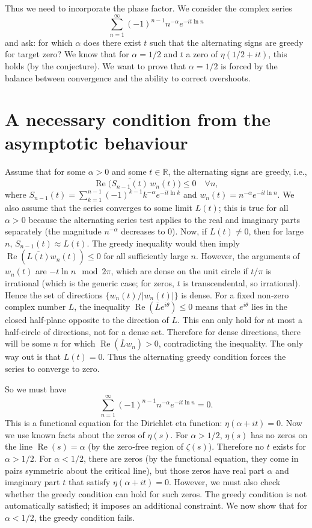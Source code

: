 \documentclass[12pt,a4paper]{article}
\begin{document}
Thus we need to incorporate the phase factor. We consider the complex series
\[
\sum_{n=1}^\infty (-1)^{n-1} n^{-\alpha} e^{-i t \ln n}
\]
and ask: for which $\alpha$ does there exist $t$ such that the alternating signs are greedy for target zero? We know that for $\alpha=1/2$ and $t$ a zero of $\eta(1/2+it)$, this holds (by the conjecture). We want to prove that $\alpha=1/2$ is forced by the balance between convergence and the ability to correct overshoots.

\section{A necessary condition from the asymptotic behaviour}

Assume that for some $\alpha>0$ and some $t\in\mathbb{R}$, the alternating signs are greedy, i.e.,
\[
\operatorname{Re}\bigl(\overline{S_{n-1}(t)} \, w_n(t)\bigr) \le 0 \quad \forall n,
\]
where $S_{n-1}(t) = \sum_{k=1}^{n-1} (-1)^{k-1} k^{-\alpha} e^{-i t \ln k}$ and $w_n(t)=n^{-\alpha}e^{-i t \ln n}$. We also assume that the series converges to some limit $L(t)$; this is true for all $\alpha>0$ because the alternating series test applies to the real and imaginary parts separately (the magnitude $n^{-\alpha}$ decreases to 0). Now, if $L(t) \neq 0$, then for large $n$, $S_{n-1}(t) \approx L(t)$. The greedy inequality would then imply $\operatorname{Re}(\overline{L(t)} w_n(t)) \le 0$ for all sufficiently large $n$. However, the arguments of $w_n(t)$ are $-t \ln n \mod 2\pi$, which are dense on the unit circle if $t/\pi$ is irrational (which is the generic case; for zeros, $t$ is transcendental, so irrational). Hence the set of directions $\{w_n(t)/|w_n(t)|\}$ is dense. For a fixed non‑zero complex number $L$, the inequality $\operatorname{Re}(\overline{L} e^{i\theta}) \le 0$ means that $e^{i\theta}$ lies in the closed half‑plane opposite to the direction of $L$. This can only hold for at most a half‑circle of directions, not for a dense set. Therefore for dense directions, there will be some $n$ for which $\operatorname{Re}(\overline{L} w_n) > 0$, contradicting the inequality. The only way out is that $L(t)=0$. Thus the alternating greedy condition forces the series to converge to zero.

So we must have
\[
\sum_{n=1}^\infty (-1)^{n-1} n^{-\alpha} e^{-i t \ln n} = 0.
\]
This is a functional equation for the Dirichlet eta function: $\eta(\alpha + i t)=0$. Now we use known facts about the zeros of $\eta(s)$. For $\alpha > 1/2$, $\eta(s)$ has no zeros on the line $\operatorname{Re}(s)=\alpha$ (by the zero‑free region of $\zeta(s)$). Therefore no $t$ exists for $\alpha>1/2$. For $\alpha < 1/2$, there are zeros (by the functional equation, they come in pairs symmetric about the critical line), but those zeros have real part $\alpha$ and imaginary part $t$ that satisfy $\eta(\alpha+it)=0$. However, we must also check whether the greedy condition can hold for such zeros. The greedy condition is not automatically satisfied; it imposes an additional constraint. We now show that for $\alpha < 1/2$, the greedy condition fails.
\end{document}
